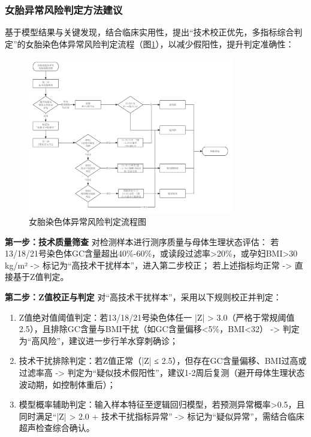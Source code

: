 \documentclass[withoutpreface,bwprint]{cumcmthesis} %
\begin{document}
\subsubsection{女胎异常风险判定方法建议}
基于模型结果与关键发现，结合临床实用性，提出“技术校正优先，多指标综合判定”的女胎染色体异常风险判定流程（图\ref{fig:q4-flow-chart}），以减少假阳性，提升判定准确性：
\begin{figure}[H]
    \centering
    \includegraphics[width=0.8\textwidth]{../figure/q4_flow_chart.png}
    \caption{女胎染色体异常风险判定流程图}
    \label{fig:q4-flow-chart}
\end{figure}

\textbf{第一步：技术质量筛查}
对检测样本进行测序质量与母体生理状态评估：  
若13/18/21号染色体GC含量超出40\%-60\%，或读段过滤率>20\%，或孕妇BMI>30 kg/m² -> 标记为“高技术干扰样本”，进入第二步校正；  
若上述指标均正常 -> 直接基于Z值判定。

\textbf{第二步：Z值校正与判定}
对“高技术干扰样本”，采用以下规则校正并判定：
\begin{enumerate}
    \item Z值绝对值阈值判定：若13/18/21号染色体任一 |Z| > 3.0（严格于常规阈值2.5），且排除GC含量与BMI干扰（如GC含量偏移<5\%，BMI<32） -> 判定为“高风险”，建议进一步行羊水穿刺确诊；
    \item 技术干扰排除判定：若Z值正常（|Z| ≤ 2.5），但存在GC含量偏移、BMI过高或过滤率高 -> 判定为“疑似技术假阳性”，建议1-2周后复测（避开母体生理状态波动期，如控制体重后）；
    \item 模型概率辅助判定：输入样本特征至逻辑回归模型，若预测异常概率>0.5，且同时满足“|Z| > 2.0 + 技术干扰指标异常” -> 标记为“疑似异常”，需结合临床超声检查综合确认。
\end{enumerate}


\end{document}
